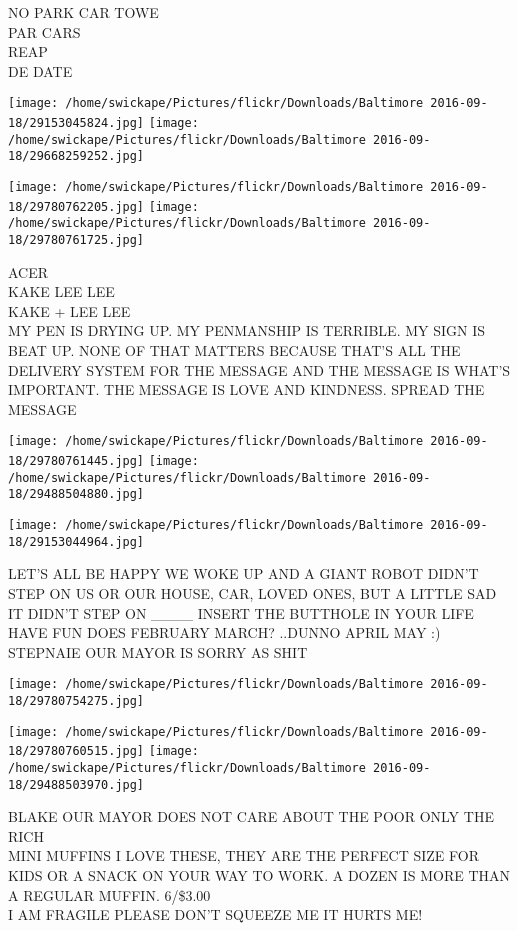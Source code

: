 \documentclass[10pt,letterpaper]{article}
\begin{document}
NO PARK CAR TOWE\\
PAR CARS\\
REAP\\
DE DATE
\pagebreak

\texttt{[image: /home/swickape/Pictures/flickr/Downloads/Baltimore 2016-09-18/29153045824.jpg]}
\texttt{[image: /home/swickape/Pictures/flickr/Downloads/Baltimore 2016-09-18/29668259252.jpg]}

\texttt{[image: /home/swickape/Pictures/flickr/Downloads/Baltimore 2016-09-18/29780762205.jpg]}
\texttt{[image: /home/swickape/Pictures/flickr/Downloads/Baltimore 2016-09-18/29780761725.jpg]}

ACER\\
KAKE LEE LEE\\
KAKE + LEE LEE\\
MY PEN IS DRYING UP.  MY PENMANSHIP IS TERRIBLE.  MY SIGN IS BEAT UP.  NONE OF THAT MATTERS BECAUSE THAT'S ALL THE DELIVERY SYSTEM FOR THE MESSAGE AND THE MESSAGE IS WHAT'S IMPORTANT.  THE MESSAGE IS LOVE AND KINDNESS.  SPREAD THE MESSAGE
\pagebreak

\texttt{[image: /home/swickape/Pictures/flickr/Downloads/Baltimore 2016-09-18/29780761445.jpg]}
\texttt{[image: /home/swickape/Pictures/flickr/Downloads/Baltimore 2016-09-18/29488504880.jpg]}

\vspace{0.25in}
\texttt{[image: /home/swickape/Pictures/flickr/Downloads/Baltimore 2016-09-18/29153044964.jpg]}

LET'S ALL BE HAPPY WE WOKE UP AND A GIANT ROBOT DIDN'T STEP ON US OR OUR HOUSE, CAR, LOVED ONES, BUT A LITTLE SAD IT DIDN'T STEP ON \_\_\_\_ INSERT THE BUTTHOLE IN YOUR LIFE\\
HAVE FUN DOES FEBRUARY MARCH?  ..DUNNO APRIL MAY :)\\
STEPNAIE OUR MAYOR IS SORRY AS SHIT
\pagebreak

\texttt{[image: /home/swickape/Pictures/flickr/Downloads/Baltimore 2016-09-18/29780754275.jpg]}

\vspace{0.25in}
\texttt{[image: /home/swickape/Pictures/flickr/Downloads/Baltimore 2016-09-18/29780760515.jpg]}
\texttt{[image: /home/swickape/Pictures/flickr/Downloads/Baltimore 2016-09-18/29488503970.jpg]}

BLAKE OUR MAYOR DOES NOT CARE ABOUT THE POOR ONLY THE RICH\\
MINI MUFFINS I LOVE THESE, THEY ARE THE PERFECT SIZE FOR KIDS OR A SNACK ON YOUR WAY TO WORK.  A DOZEN IS MORE THAN A REGULAR MUFFIN.  6/\$3.00\\
I AM FRAGILE PLEASE DON'T SQUEEZE ME IT HURTS ME!
\pagebreak
\end{document}
